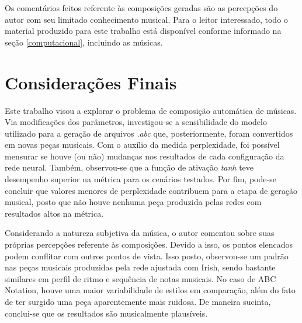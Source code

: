 \documentclass[twoside]{automatextcc}
\newcommand{\nico}[1]{\textcolor{teal}{#1}}
\newcommand{\pumi}[1]{\textcolor{red}{#1}}
\begin{document}
Os comentários feitos referente às composições geradas são as percepções do autor com seu limitado conhecimento musical. Para o leitor interessado, todo o material produzido para este trabalho está disponível conforme informado na seção \ref{computacional}, incluindo as músicas.




\chapter{Considerações Finais}



Este trabalho visou a explorar o problema de composição automática de músicas. Via modificações dos parâmetros, investigou-se a sensibilidade do modelo utilizado para a geração de arquivos \textit{.abc} que, posteriormente, foram convertidos em novas peças musicais. Com o auxílio da medida perplexidade, foi possível mensurar se houve (ou não) mudanças nos resultados de cada configuração da rede neural. Também, observou-se que a função de ativação \textit{tanh} teve desempenho superior na métrica para os cenários testados. Por fim, pode-se concluir que valores menores de perplexidade contribuem para a etapa de geração musical, posto que não houve nenhuma peça produzida pelas redes com resultados altos na métrica. 

Considerando a natureza subjetiva da música, o autor comentou sobre suas próprias percepções referente às composições. Devido a isso, os pontos elencados podem conflitar com outros pontos de vista. Isso posto, observou-se um padrão nas peças musicais produzidas pela rede ajustada com Irish, sendo bastante similares em perfil de ritmo e sequência de notas musicais. No caso de ABC Notation, houve uma maior variabilidade de estilos em comparação, além do fato de ter surgido uma peça aparentemente mais ruidosa. De maneira sucinta, conclui-se que os resultados são musicalmente plausíveis.
\end{document}
